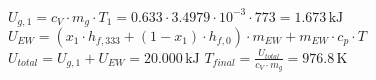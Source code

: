 \( U_{g,1} = c_V \cdot m_g \cdot T_1 = 0.633 \cdot 3.4979 \cdot 10^{-3} \cdot 773 = 1.673 \, \text{kJ} \)  
\( U_{EW} = (x_1 \cdot h_{f,333} + (1 - x_1) \cdot h_{f,0}) \cdot m_{EW} + m_{EW} \cdot c_p \cdot T \)  
\( U_{total} = U_{g,1} + U_{EW} = 20.000 \, \text{kJ} \)  
\( T_{final} = \frac{U_{total}}{c_V \cdot m_g} = 976.8 \, \text{K} \)